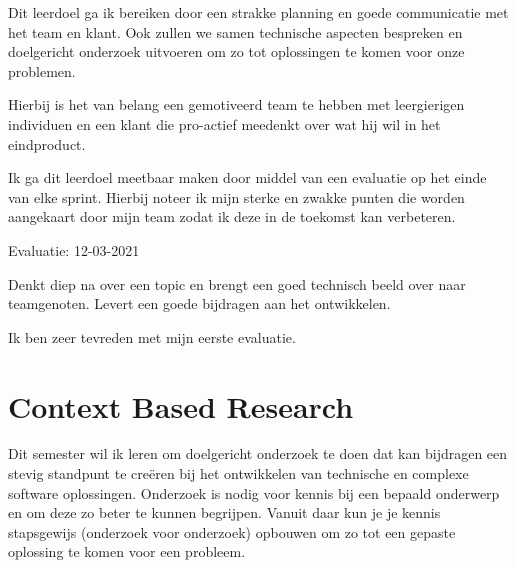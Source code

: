Dit leerdoel ga ik bereiken door een strakke planning en goede communicatie met het team en klant.
Ook zullen we samen technische aspecten bespreken en doelgericht onderzoek uitvoeren om zo tot oplossingen te komen
voor onze problemen.


Hierbij is het van belang een gemotiveerd team te hebben met leergierigen individuen en een klant die pro-actief
meedenkt over wat hij wil in het eindproduct.


Ik ga dit leerdoel meetbaar maken door middel van een evaluatie op het einde van elke sprint. Hierbij noteer ik
mijn sterke en zwakke punten die worden aangekaart door mijn team zodat ik deze in de toekomst kan verbeteren.

\bigskip
Evaluatie: 12-03-2021

Denkt diep na over een topic en brengt een goed technisch beeld over naar teamgenoten.
Levert een goede bijdragen aan het ontwikkelen.


\bigskip
Ik ben zeer tevreden met mijn eerste evaluatie.


\section{Context Based Research}\label{sec:context-based-research}


Dit semester wil ik leren om doelgericht onderzoek te doen dat kan bijdragen een stevig
standpunt te creëren bij het ontwikkelen van technische en complexe software oplossingen.
Onderzoek is nodig voor kennis bij een bepaald onderwerp en om deze zo beter te kunnen begrijpen.
Vanuit daar kun je je kennis stapsgewijs (onderzoek voor onderzoek) opbouwen om zo tot een gepaste oplossing te
komen voor een probleem.


